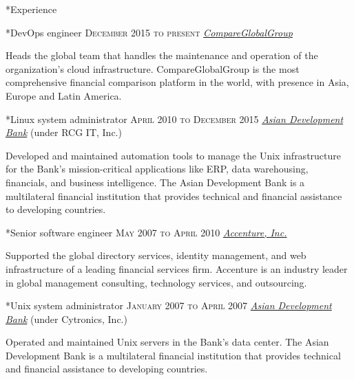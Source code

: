 \documentclass[10pt, a4paper, final]{article}
\begin{document}
\hfill
\begin{minipage}[t]{0.65\linewidth}
  \begin{section}*{Experience}
    \begin{subsection}*{DevOps engineer \hfill\textsc{December 2015 to present}}
      \href{http://www.compareglobalgroup.com}{\textit{CompareGlobalGroup}}  

      Heads the global team that handles the maintenance and operation of the organization's cloud infrastructure. CompareGlobalGroup is the most comprehensive financial comparison platform in the world, with presence in Asia, Europe and Latin America.
    \end{subsection}
    \vspace{1em}
  
    \begin{subsection}*{Linux system administrator \hfill\textsc{April 2010 to December 2015}}
      \href{http://www.adb.org/}{\textit{Asian Development Bank}} (under RCG IT, Inc.) 

      Developed and maintained automation tools to manage the Unix infrastructure for the Bank's mission-critical applications like ERP, data warehousing, financials, and business intelligence. The Asian Development Bank is a multilateral financial institution that provides technical and financial assistance to developing countries.
    \end{subsection}
    \vspace{1em}
  
    \begin{subsection}*{Senior software engineer \hfill\textsc{May 2007 to April 2010}}
      \href{http://www.accenture.com}{\textit{Accenture, Inc.}}  

      Supported the global directory services, identity management, and web infrastructure of a leading financial services firm. Accenture is an industry leader in global management consulting, technology services, and outsourcing.
    \end{subsection}
    \vspace{1em}
  
    \begin{subsection}*{Unix system administrator \hfill\textsc{January 2007 to April 2007}}
      \href{http://www.adb.org}{\textit{Asian Development Bank}} (under Cytronics, Inc.) 

      Operated and maintained Unix servers in the Bank's data center. The Asian Development Bank is a multilateral financial institution that provides technical and financial assistance to developing countries.
    \end{subsection}
    \vspace{1em}
  

\end{section}
\end{minipage}
\end{document}
